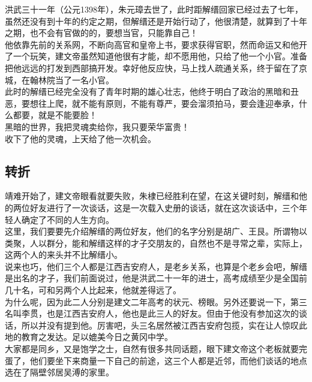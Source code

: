 \begin{multicols}{\theparacolNo}
洪武三十一年（公元1398年），朱元璋去世了，此时距解缙回家已经过去了七年，虽然还没有到十年的约定之期，但解缙还是开始行动了，他很清楚，就算到了十年之期，也不会有官做的的，要想当官，只能靠自己！\\

他依靠先前的关系网，不断向高官和皇帝上书，要求获得官职，然而命运又和他开了一个玩笑，建文帝虽然知道他很有才能，却不愿用他，只给了他一个小官。准备把他远远的打发到西部搞开发。幸好他反应快，马上找人疏通关系，终于留在了京城，在翰林院当了一名小官。\\

此时的解缙已经完全没有了青年时期的雄心壮志，他终于明白了政治的黑暗和丑恶，要想往上爬，就不能有原则，不能有尊严，要会溜须拍马，要会逢迎奉承，什么都要，就是不能要脸！\\

黑暗的世界，我把灵魂卖给你，我只要荣华富贵！\\

收下了他的灵魂，上天给了他一次机会。\\

\subsection{转折}
靖难开始了，建文帝眼看就要失败，朱棣已经胜利在望，在这关键时刻，解缙和他的两位好友进行了一次谈话，这是一次载入史册的谈话，就在这次谈话中，三个年轻人确定了不同的人生方向。\\

这里，我们要要先介绍解缙的两位好友，他们的名字分别是胡广、王艮。所谓物以类聚，人以群分，能和解缙这样的才子交朋友的，自然也不是寻常之辈，实际上，这两个人的来头并不比解缙小。\\

说来也巧，他们三个人都是江西吉安府人，是老乡关系，也算是个老乡会吧，解缙是出名的才子，我们前面说过，他是洪武二十一年的进士，高考成绩至少是全国前几十名，可和另两个人比起来，他就差得远了。\\

为什么呢，因为此二人分别是建文二年高考的状元、榜眼。另外还要说一下，第三名叫李贯，也是江西吉安府人，他也是此三人的好友。但由于他没有参加这次的谈话，所以并没有提到他。厉害吧，头三名居然被江西吉安府包揽，实在让人惊叹此地的教育之发达。足以媲美今日之黄冈中学。\\

大家都是同乡，又是饱学之士，自然有很多共同话题，眼下建文帝这个老板就要完蛋了，他们要坐下来商量一下自己的前途，这三个人都是近邻，而他们谈话的地点选在了隔壁邻居吴溥的家里。\\


\end{multicols}
